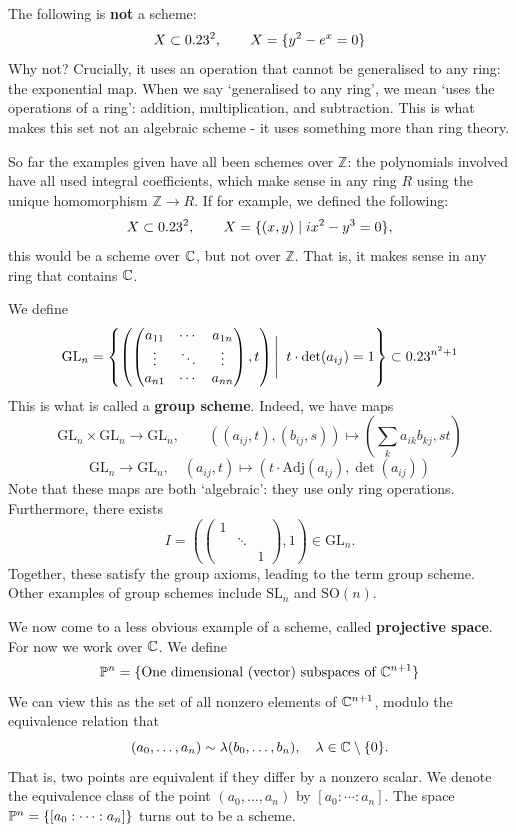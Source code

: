 \begin{nonexample}
    The following is \textbf{not} a scheme:
    \[
    X\subset\A^2, \qquad X=\{y^2-e^x=0\} 
    \]
    Why not? Crucially, it uses an operation that cannot be generalised to any ring: the exponential map. When we say `generalised to any ring', we mean `uses the operations of a ring': addition, multiplication, and subtraction. This is what makes this set not an algebraic scheme - it uses something more than ring theory. 
\end{nonexample}
So far the examples given have all been schemes over $\mathbb{Z}$: the polynomials involved have all used integral coefficients, which make sense in any ring $R$ using the unique homomorphism $\mathbb{Z}\to R$. If for example, we defined the following:
\[
X\subset \A^2, \qquad X=\{(x,y)\mid ix^2-y^3=0\},
\]
this would be a scheme over $\C$, but not over $\mathbb{Z}$. That is, it makes sense in any ring that contains $\C$.
\begin{example}
    We define
    \[
    \mathrm{GL}_n=\left\{\left(\begin{pmatrix}
        a_{11} &\cdots &a_{1n} \\
        \vdots & \ddots & \vdots \\
        a_{n1} &\cdots & a_{nn}
    \end{pmatrix},t\right) \Bigg|\;\; t\cdot \det(a_{ij})=1\right\}\subset \A^{n^2+1}
    \]
    This is what is called a \textbf{group scheme}. Indeed, we have maps
    \[
    \mathrm{GL}_n\times\mathrm{GL}_n\to\mathrm{GL}_n, \qquad ((a_{ij},t),(b_{ij},s))\mapsto \left(\sum_k a_{ik}b_{kj},st\right)
    \]
    \[
    \mathrm{GL}_n\to\mathrm{GL}_n, \quad (a_{ij},t)\mapsto (t\cdot \mathrm{Adj}(a_{ij}), \det(a_{ij}))
    \]
    Note that these maps are both `algebraic': they use only ring operations. Furthermore, there exists
    \[
    I=\left(\begin{pmatrix}
        1 &  & \\
        & \ddots & \\
        & & 1
    \end{pmatrix},1\right)\in\mathrm{GL}_n.
    \]
    Together, these satisfy the group axioms, leading to the term group scheme. Other examples of group schemes include $\mathrm{SL}_n$ and $\mathrm{SO}(n)$.
\end{example}
\begin{example}
    We now come to a less obvious example of a scheme, called \textbf{projective space}. For now we work over $\C$. We define
    \[
    \P^n=\{\text{One dimensional (vector) subspaces of }\C^{n+1}\}
    \]
    We can view this as the set of all nonzero elements of $\C^{n+1}$, modulo the equivalence relation that
    \[
    (a_0,\ldots,a_n)\sim\lambda(b_0,\ldots,b_n), \quad \lambda\in \C\setminus\{0\}.
    \]
    That is, two points are equivalent if they differ by a nonzero scalar. We denote the equivalence class of the point $(a_0,\ldots,a_n)$ by $[a_0:\cdots:a_n]$. The space $\P^n=\{[a_0:\cdots:a_n]\}$ turns out to be a scheme.
\end{example}
